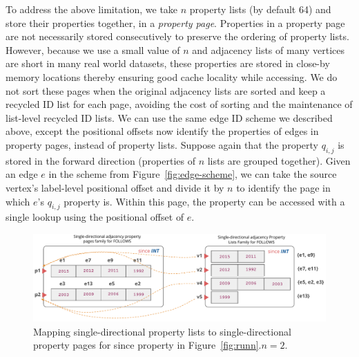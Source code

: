  To address the above limitation, we take $n$ property lists (by default 64) and store their properties together, in a  \emph{property page}. Properties in a property page are not necessarily stored consecutively to preserve the ordering of property lists. However, because we use a small value of $n$ and adjacency lists of many vertices are short in many real world datasets, these properties are stored in close-by memory locations thereby ensuring good cache locality while accessing. We do not sort these pages when the original adjacency lists are sorted and keep a recycled ID list for each page, avoiding the cost of sorting and the maintenance of list-level recycled ID lists. We can use the same edge ID scheme we described above, except the positional offsets now identify the properties of edges in property pages, instead of property lists. Suppose again that the property $q_{i, j}$ is stored in the forward direction (properties of $n$ lists are grouped together). Given an edge $e$ in the scheme from Figure~\ref{fig:edge-scheme}, we can take the source vertex's label-level positional offset and divide it by $n$ to identify the page in which $e$'s $q_{i, j}$ property is. Within this page, the property can be accessed with a single lookup using the positional offset of $e$.

\begin{figure}
	\hfill\includegraphics[scale=0.78]{img/paged}\hspace*{\fill}
	\captionsetup{justification=centering}
	\caption{Mapping single-directional property lists to single-directional property pages for since property in Figure~\ref{fig:runn}.$n=2$.}
	\label{fig:paged}
\end{figure}


